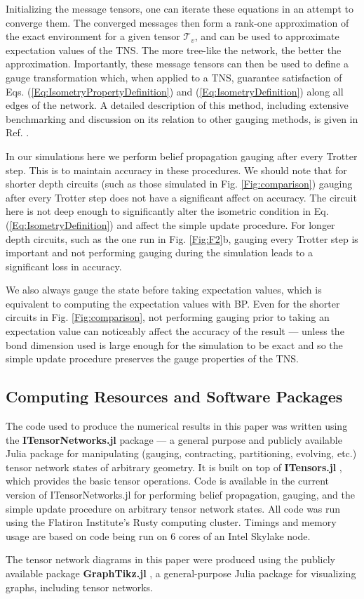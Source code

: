 \documentclass[%
 superscriptaddress,
 amsmath,amssymb,
 prx,
]{revtex4-2}
\begin{document}
Initializing the message tensors, one can iterate these equations in an attempt to converge them. The converged messages then form a rank-one approximation of the exact environment for a given tensor $\mathcal{T}_{v}$, and can be used to approximate expectation values of the TNS. The more tree-like the network, the better the approximation. Importantly, these message tensors can then be used to define a gauge transformation which, when applied to a TNS, guarantee satisfaction of Eqs. (\ref{Eq:IsometryPropertyDefinition}) and (\ref{Eq:IsometryDefinition}) along all edges of the network. 
A detailed description of this method, including extensive benchmarking and discussion on its relation to other gauging methods, is given in Ref. \cite{TindallGauging2023}. 
\par In our simulations here we perform belief propagation gauging after every Trotter step. This is to maintain accuracy in these procedures. We should note that for shorter depth circuits (such as those simulated in Fig. \ref{Fig:comparison}) gauging after every Trotter step does not have a significant affect on accuracy. The circuit here is not deep enough to significantly alter the isometric condition in Eq. (\ref{Eq:IsometryDefinition}) and affect the simple update procedure. For longer depth circuits, such as the one run in Fig. \ref{Fig:F2}b, gauging every Trotter step is important and not performing gauging during the simulation leads to a significant loss in accuracy. 
\par We also always gauge the state before taking expectation values, which is equivalent to computing the expectation values with BP. Even for the shorter circuits in Fig. \ref{Fig:comparison}, not performing gauging prior to taking an expectation value can noticeably affect the accuracy of the result --- unless the bond dimension used is large enough for the simulation to be exact and so the simple update procedure preserves the gauge properties of the TNS.

\subsection*{Computing Resources and Software Packages}
The code used to produce the numerical results in this paper was written using the \textbf{ITensorNetworks.jl} package \cite{ITensorNetworks} --- a general purpose and publicly available Julia \cite{bezanson2017julia} package for manipulating (gauging, contracting, partitioning, evolving, etc.) tensor network states of arbitrary geometry. It is built on top of \textbf{ITensors.jl} \cite{itensor-r0.3}, which provides the basic tensor operations. 
Code is available in the current version of ITensorNetworks.jl for performing belief propagation, gauging, and the simple update procedure on arbitrary tensor network states. All code was run using the Flatiron Institute's Rusty computing cluster. Timings and memory usage are based on code being run on $6$ cores of an Intel Skylake node.
\par The tensor network diagrams in this paper were produced using the publicly available package \textbf{GraphTikz.jl} \cite{GraphTikz}, a general-purpose Julia package for visualizing graphs, including tensor networks.
\end{document}
